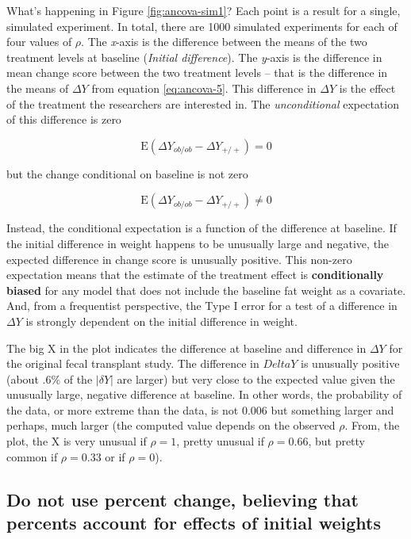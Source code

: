 \documentclass[]{book}
\begin{document}
What's happening in Figure \ref{fig:ancova-sim1}? Each point is a result for a single, simulated experiment. In total, there are 1000 simulated experiments for each of four values of \(\rho\). The \emph{x}-axis is the difference between the means of the two treatment levels at baseline (\emph{Initial difference}). The \emph{y}-axis is the difference in mean change score between the two treatment levels -- that is the difference in the means of \(\Delta Y\) from equation \eqref{eq:ancova-5}. This difference in \(\Delta Y\) is the effect of the treatment the researchers are interested in. The \emph{unconditional} expectation of this difference is zero

\begin{equation}
\mathrm{E}(\Delta Y_{ob/ob} - \Delta Y_{+/+}) = 0
\end{equation}

but the change conditional on baseline is not zero

\begin{equation}
\mathrm{E}(\Delta Y_{ob/ob} - \Delta Y_{+/+}) \ne 0
\end{equation}

Instead, the conditional expectation is a function of the difference at baseline. If the initial difference in weight happens to be unusually large and negative, the expected difference in change score is unusually positive. This non-zero expectation means that the estimate of the treatment effect is \textbf{conditionally biased} for any model that does not include the baseline fat weight as a covariate. And, from a frequentist perspective, the Type I error for a test of a difference in \(\Delta Y\) is strongly dependent on the initial difference in weight.

The big X in the plot indicates the difference at baseline and difference in \(\Delta Y\) for the original fecal transplant study. The difference in \(Delta Y\) is unusually positive (about .6\% of the \(|\delta Y|\) are larger) but very close to the expected value given the unusually large, negative difference at baseline. In other words, the probability of the data, or more extreme than the data, is not 0.006 but something larger and perhaps, much larger (the computed value depends on the observed \(\rho\). From, the plot, the X is very unusual if \(\rho=1\), pretty unusual if \(\rho=0.66\), but pretty common if \(\rho=0.33\) or if \(\rho=0\)).

\hypertarget{do-not-use-percent-change-believing-that-percents-account-for-effects-of-initial-weights}{%
\subsection{Do not use percent change, believing that percents account for effects of initial weights}\label{do-not-use-percent-change-believing-that-percents-account-for-effects-of-initial-weights}}
\end{document}
